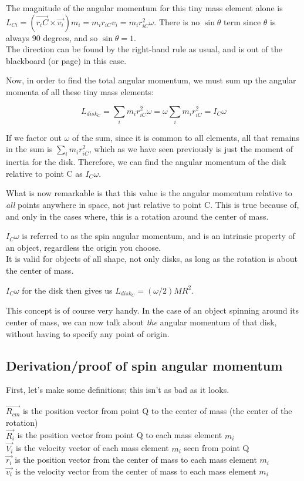The magnitude of the angular momentum for this tiny mass element alone is $L_{Ci} = (\vec{r_iC} \times \vec{v_i}) m_i = m_i r_{iC} v_i = m_i r_{iC}^2 \omega$. There is no $\sin \theta$ term since $\theta$ is always 90 degrees, and so $\sin \theta = 1$.\\
The direction can be found by the right-hand rule as usual, and is out of the blackboard (or page) in this case.

Now, in order to find the total angular momentum, we must sum up the angular momenta of all these tiny mass elements:

\begin{equation}
L_{disk_C} = \sum_i m_i r_{iC}^2 \omega = \omega \sum_i m_i r_{iC}^2 = I_C \omega
\end{equation}

If we factor out $\omega$ of the sum, since it is common to all elements, all that remains in the sum is $\sum_i m_i r_{iC}^2$, which as we have seen previously is just the moment of inertia for the disk. Therefore, we can find the angular momentum of the disk relative to point C as $I_C \omega$.

What is now remarkable is that this value is the angular momentum relative to \emph{all} points anywhere in space, not just relative to point C. This is true because of, and only in the cases where, this is a rotation around the center of mass.

$I_C \omega$ is referred to as the spin angular momentum, and is an intrinsic property of an object, regardless the origin you choose.\\
It is valid for objects of all shape, not only disks, as long as the rotation is about the center of mass.

$I_C \omega$ for the disk then gives us $L_{disk_C} = (\omega/2) M R^2$.

This concept is of course very handy. In the case of an object spinning around its center of mass, we can now talk about \emph{the} angular momentum of that disk, without having to specify any point of origin.

\subsection{Derivation/proof of spin angular momentum}

First, let's make some definitions; this isn't as bad as it looks.

$\vec{R_{cm}}$ is the position vector from point Q to the center of mass (the center of the rotation)\\
$\vec{R_i}$ is the position vector from point Q to each mass element $m_i$\\
$\vec{V_i}$ is the velocity vector of each mass element $m_i$ seen from point Q\\
$\vec{r_i}$ is the position vector from the center of mass to each mass element $m_i$\\
$\vec{v_i}$ is the velocity vector from the center of mass to each mass element $m_i$

